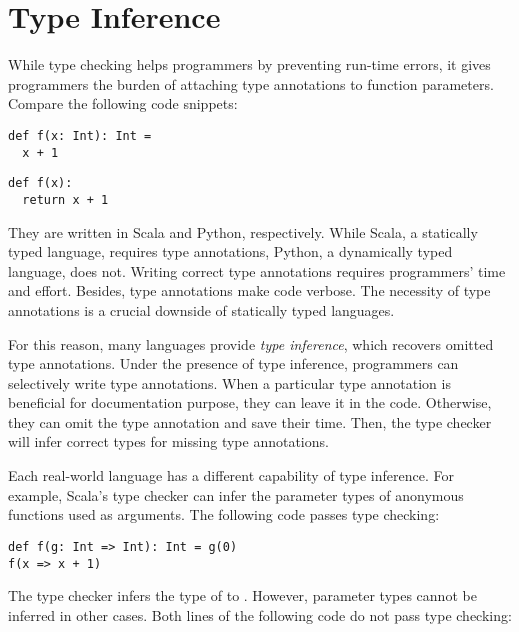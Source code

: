 \setchapterpreamble[u]{\margintoc}
\chapter{Type Inference}

\renewcommand{\plang}{\textsf{TFAE}\xspace}
\renewcommand{\lang}{\textsf{TIFAE}\xspace}

While type checking helps programmers by preventing run-time errors, it gives
programmers the burden of attaching type annotations to function parameters.
Compare the following code snippets:

\begin{verbatim}
def f(x: Int): Int =
  x + 1
\end{verbatim}

\begin{verbatim}
def f(x):
  return x + 1
\end{verbatim}

They are written in Scala and Python, respectively. While Scala, a statically
typed language, requires type annotations, Python, a dynamically typed language,
does not. Writing correct type annotations requires programmers' time and
effort. Besides, type annotations make code verbose. The necessity of type
annotations is a crucial downside of statically typed languages.

For this reason, many languages provide \textit{type inference}, which recovers omitted type annotations. Under the presence of type
inference, programmers can selectively write type annotations. When a particular
type annotation is beneficial for documentation purpose, they can leave it in
the code. Otherwise, they can omit the type annotation and save their time.
Then, the type checker will infer correct types for missing type annotations.

Each real-world language has a different capability of type inference. For
example, Scala's type checker can infer the parameter types of anonymous
functions used as arguments. The following code passes type checking:

\begin{verbatim}
def f(g: Int => Int): Int = g(0)
f(x => x + 1)
\end{verbatim}

The type checker infers the type of  to . However, parameter
types cannot be inferred in other cases. Both lines of the following code do
not pass type checking:

